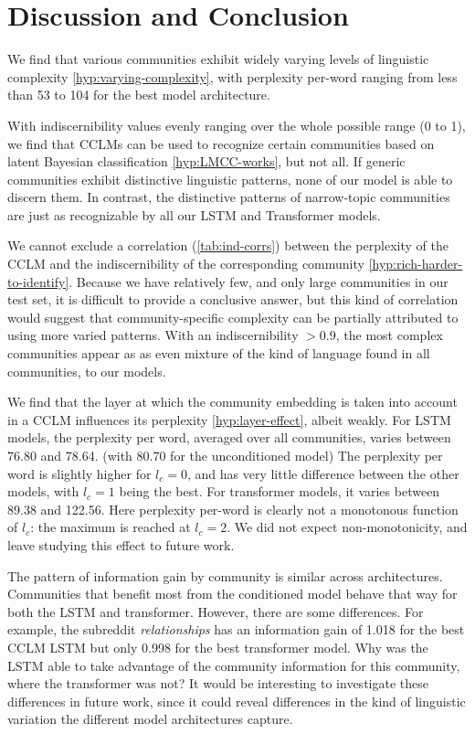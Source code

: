 \documentclass[11pt,a4paper]{article}
\newcommand\bn[1]{\todo[backgroundcolor=green!10]{BN: #1}}
\begin{document}
\section{Discussion and Conclusion}

We find that various communities exhibit widely varying levels of
linguistic complexity \ref{hyp:varying-complexity}, with perplexity
per-word ranging from less than 53 to 104 for the best model
architecture.

With indiscernibility values evenly ranging over the whole possible
range (0 to 1), we find that CCLMs can be used to recognize certain
communities based on latent Bayesian classification
\ref{hyp:LMCC-works}, but not all.  If generic communities exhibit
distinctive linguistic patterns, none of our model is able to discern
them. In contrast, the distinctive patterns of narrow-topic
communities are just as recognizable by all our LSTM and Transformer
models.

We cannot exclude a correlation (\cref{tab:ind-corrs}) between the
perplexity of the
CCLM and the indiscernibility of the corresponding community
\ref{hyp:rich-harder-to-identify}. Because we have relatively few, and
only large communities in our test set, it is difficult to provide a
conclusive answer, but this kind of correlation would suggest that
community-specific complexity can be partially attributed to using
more varied patterns. With an indiscernibility $> 0.9$, the most
complex communities appear as as even mixture of the kind of language
found in all communities, to our models.

We find that the layer at which the community embedding is taken into
account in a CCLM influences its perplexity \ref{hyp:layer-effect},
albeit weakly. For LSTM models, the perplexity per word, averaged over
all communities, varies between 76.80 and 78.64. (with 80.70 for the
unconditioned model) The perplexity per word is slightly higher for
$l_c=0$, and has very little difference between the other models, with
$l_c=1$ being the best.  For transformer models, it varies between
89.38 and 122.56. Here perplexity per-word is clearly not a monotonous
function of $l_c$: the maximum is reached at $l_c=2$. We did not
expect non-monotonicity, and leave studying this effect to future
work.

The pattern of information gain by community is similar across
architectures.  Communities that benefit most from the conditioned
model behave that way for both the LSTM and transformer.  However,
there are some differences.  For example, the subreddit
\emph{relationships} has an information gain of \num{1.018} for the
best CCLM LSTM but only \num{0.998} for the best transformer model.
Why was the LSTM able to take advantage of the community information
for this community, where the transformer was not?  It would be
interesting to investigate these differences in future work, since it
could reveal differences in the kind of linguistic variation the
different model architectures capture.
\end{document}
